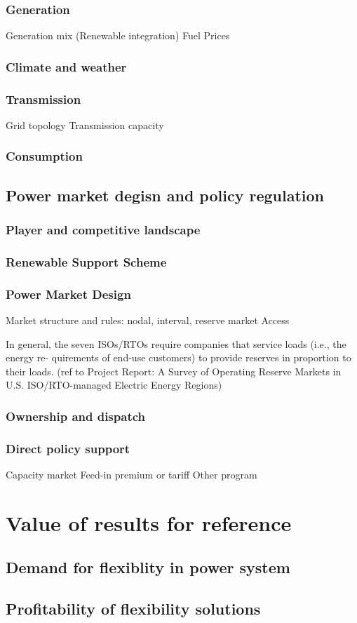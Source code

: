 \subsubsection{Generation}
Generation mix (Renewable integration)
Fuel Prices
\subsubsection{Climate and weather}

\subsubsection{Transmission}
Grid topology
Transmission capacity

\subsubsection{Consumption}


\subsection{Power market degisn and policy regulation}
\subsubsection{Player and competitive landscape}

\subsubsection{Renewable Support Scheme}

\subsubsection{Power Market Design}
Market structure and rules: nodal, interval, reserve market
Access

In general, the seven ISOs/RTOs require companies that service loads (i.e., the energy re- quirements of end-use customers) to provide reserves in proportion to their loads. (ref to Project Report: A Survey of Operating Reserve Markets in U.S. ISO/RTO-managed Electric Energy Regions)


\subsubsection{Ownership and dispatch}

\subsubsection{Direct policy support}
Capacity market
Feed-in premium or tariff
Other program

\section{Value of results for reference}
\subsection{Demand for flexiblity in power system}

\subsection{Profitability of flexibility solutions}

